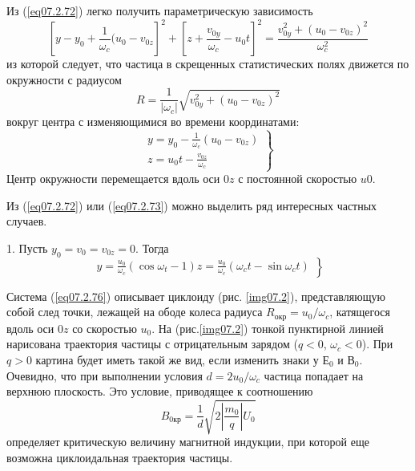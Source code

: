 Из (\ref{eq07.2.72}) легко получить параметрическую зависимость
\begin{equation}
	\left[ y - y_0 + \frac{1}{\omega_c}(u_0 - v_{0z} \right]^2 + 
		\left[ z + \frac{v_{0y}}{\omega_c} - u_0 t \right]^2 = 
		\frac{v^2_{0y} + (u_0 - v_{0z})^2}{\omega^2_c}
	\label{eq07.2.73}
\end{equation}
из которой следует, что частица в скрещенных статистических полях движется по 
окружности с радиусом
\begin{equation}
	R = \frac{1}{|\omega_c|}\sqrt{v^2_{0y}+(u_0 -v_{0z})^2}
	\label{eq07.2.74}
\end{equation}
вокруг центра с изменяющимися во времени координатами:
\begin{equation}
	\left. \begin{array}{c}
		y = y_0 - \frac{1}{\omega_c}(u_0 - v_{0z}) \\
		z = u_0 t - \frac{v_{0z}}{\omega_c}
	\end{array} \right\}
	\label{eq07.2.75}
\end{equation}
Центр окружности перемещается вдоль оси \( 0z \) с постоянной скоростью 
\( u0 \).

Из (\ref{eq07.2.72}) или (\ref{eq07.2.73}) можно выделить ряд интересных 
частных случаев. 

1. Пусть \( y_0 = v_0 = v_{0z} = 0 \). Тогда
\begin{equation}
	\left. \begin{array}{c}
		y = \frac{u_0}{\omega_c}(\cos\omega_t - 1)
		z = \frac{u_0}{\omega_c}(\omega_c t - \sin\omega_c t)
	\end{array} \right\}
	\label{eq07.2.76}
\end{equation}

Система (\ref{eq07.2.76})  описывает циклоиду  (рис. \ref{img07.2}), 
представляющую собой след точки, лежащей на ободе колеса радиуса 
\( R_\text{окр} = u_0 / \omega_c \), катящегося вдоль оси \( 0z \) со 
скоростью \( u_0 \). На (рис.\ref{img07.2}) тонкой пунктирной линией 
нарисована траектория частицы с отрицательным зарядом (\( q < 0 \), 
\( \omega_c < 0 \)). При \( q > 0 \) картина будет иметь такой же вид, если 
изменить знаки у \( Е_0 \) и \( В_0 \). Очевидно, что при выполнении условия 
\( d = 2u_0/\omega_c \) частица попадает на верхнюю плоскость. Это условие, 
приводящее к соотношению
\[
	B_{0\text{кр}} = \frac{1}{d}\sqrt{2\left| \frac{m_0}{q} \right| U_0}
\]
определяет критическую величину магнитной индукции, при которой еще возможна 
циклоидальная траектория частицы.

